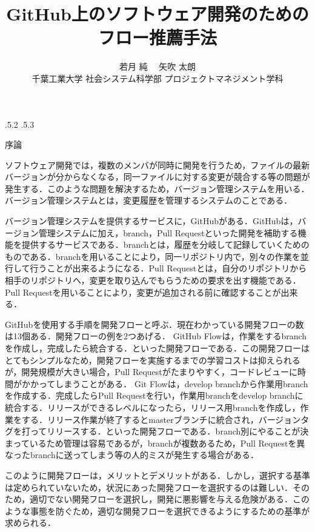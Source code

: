 \documentclass[uplatex,twocolumn]{jsarticle}
\title{\vspace{-14mm}GitHub上のソフトウェア開発のためのフロー推薦手法 \footnotemark[0]}
\author{若月 純 \footnotemark[2]　矢吹 太朗 \\ 千葉工業大学 社会システム科学部 プロジェクトマネジメント学科\footnotemark[2]}
\date{}%
\makeatletter
\renewcommand{\section}{%
    \if@slide\clearpage\fi
    \@startsection{section}{1}{\z@}%
    {\Cvs \@plus.5\Cdp \@minus.2\Cdp}%
    {.5\Cvs \@plus.3\Cdp}%
    {\normalfont\raggedright}}
\makeatother
\begin{document}
\twocolumn[
	\maketitle
]
\begingroup
\def\thefootnote{\fnsymbol{footnote}}
\endgroup

\section{序論}

ソフトウェア開発では，複数のメンバが同時に開発を行うため，ファイルの最新バージョンが分からなくなる，同一ファイルに対する変更が競合する等の問題が発生する．このような問題を解決するため，バージョン管理システムを用いる．バージョン管理システムとは，変更履歴を管理するシステムのことである\cite{ikeda2014}．

バージョン管理システムを提供するサービスに，GitHubがある．GitHubは，バージョン管理システムに加え，branch，Pull Requestといった開発を補助する機能を提供するサービスである．branchとは，履歴を分岐して記録していくためのものである．branchを用いることにより，同一リポジトリ内で，別々の作業を並行して行うことが出来るようになる．Pull Requestとは，自分のリポジトリから相手のリポジトリへ，変更を取り込んでもらうための要求を出す機能である．Pull Requestを用いることにより，変更が追加される前に確認することが出来る．

GitHubを使用する手順を開発フローと呼ぶ．現在わかっている開発フローの数は13個ある\cite{onodera2015}．開発フローの例を2つあげる．
GitHub Flowは，作業をするbranchを作成し，完成したら統合する．といった開発フローである．この開発フローはとてもシンプルなため，開発フローを実施するまでの学習コストは抑えられるが，開発規模が大きい場合，Pull Requestがたまりやすく，コードレビューに時間がかかってしまうことがある．
Git Flowは，develop branchから作業用branchを作成する．完成したらPull Requestを行い，作業用branchをdevelop branchに統合する．リリースができるレベルになったら，リリース用branchを作成し，作業をする．リリース作業が終了するとmasterブランチに統合され，バージョンタグを打ってリリースする．といった開発フローである．branch別にやることが決まっているため管理は容易であるが，branchが複数あるため，Pull Requestを異なったbranchに送ってしまう等の人的ミスが発生する場合がある\cite{ohtsuka2014}．

このように開発フローは，メリットとデメリットがある．しかし，選択する基準は定められていないため，状況にあった開発フローを選択するのは難しい．そのため，適切でない開発フローを選択し，開発に悪影響を与える危険がある．このような事態を防ぐため，適切な開発フローを選択できるようにするための基準が求められる．
\end{document}
